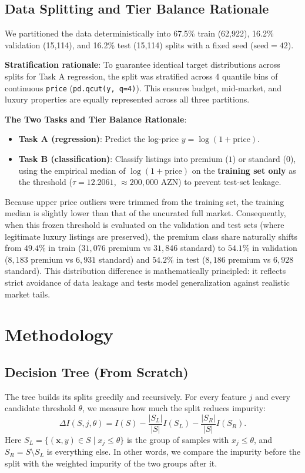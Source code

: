 \documentclass[10pt,twocolumn,a4paper]{article}
\begin{document}
  \subsection{Data Splitting and Tier Balance Rationale}
  We partitioned the data deterministically into 67.5\% train (62,922), 16.2\% validation (15,114), and 16.2\% test (15,114) splits with a fixed seed ($\text{seed}=42$).
  
  \textbf{Stratification rationale}: To guarantee identical target distributions across splits for Task A regression, the split was stratified across 4 quantile bins of continuous \texttt{price} (\texttt{pd.qcut(y, q=4)}). This ensures budget, mid-market, and luxury properties are equally represented across all three partitions.

  \textbf{The Two Tasks and Tier Balance Rationale}:
  \begin{itemize}
    \item \textbf{Task A (regression)}: Predict the log-price $y = \log(1 + \text{price})$.
    \item \textbf{Task B (classification)}: Classify listings into premium ($1$) or standard ($0$), using the empirical median of $\log(1 + \text{price})$ on the \textbf{training set only} as the threshold ($\tau = 12.2061$, $\approx 200,000$ AZN) to prevent test-set leakage.
  \end{itemize}
  Because upper price outliers were trimmed from the training set, the training median is slightly lower than that of the uncurated full market. Consequently, when this frozen threshold is evaluated on the validation and test sets (where legitimate luxury listings are preserved), the premium class share naturally shifts from $49.4\%$ in train ($31,076$ premium vs $31,846$ standard) to $54.1\%$ in validation ($8,183$ premium vs $6,931$ standard) and $54.2\%$ in test ($8,186$ premium vs $6,928$ standard). This distribution difference is mathematically principled: it reflects strict avoidance of data leakage and tests model generalization against realistic market tails.

  \section{Methodology}

  \subsection{Decision Tree (From Scratch)}
  The tree builds its splits greedily and recursively. For every feature $j$ and every candidate threshold $\theta$, we measure how much the split reduces impurity:
  \begin{equation}
    \Delta I(S, j, \theta) = I(S) - \frac{|S_L|}{|S|} I(S_L) - \frac{|S_R|}{|S|} I(S_R).
  \end{equation}
  Here $S_L = \{(\mathbf{x},y) \in S \mid x_j \le \theta\}$ is the group of samples with $x_j \le \theta$, and $S_R = S \setminus S_L$ is everything else. In other words, we compare the impurity before the split with the weighted impurity of the two groups after it.
\end{document}
